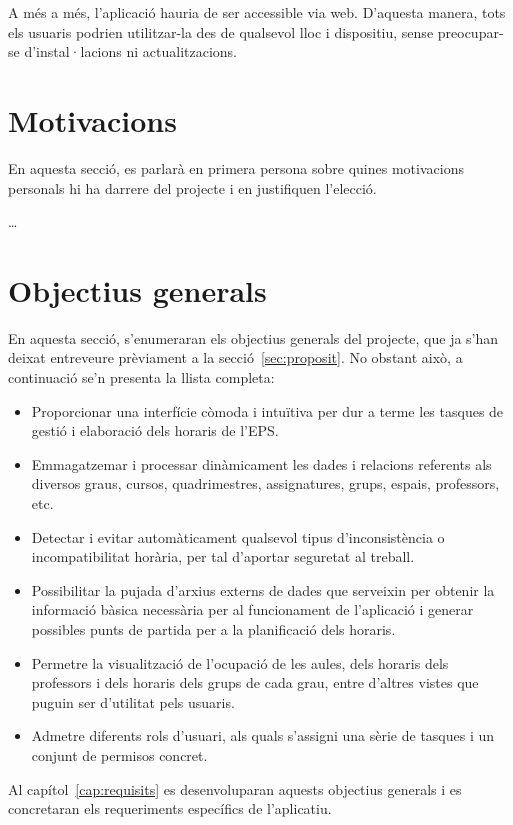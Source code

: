 \documentclass[a4paper,12pt]{ThesisStyle}
\begin{document}
A més a més, l'aplicació hauria de ser accessible via web. D'aquesta manera, tots els usuaris podrien utilitzar-la des de qualsevol lloc i dispositiu, sense
preocupar-se d'instal·lacions ni actualitzacions.

\section{Motivacions}
\label{sec:motivacions}

En aquesta secció, es parlarà en primera persona sobre quines motivacions personals hi ha darrere del projecte i en justifiquen l'elecció.

\ldots

\section{Objectius generals}
\label{sec:objectius_generals}

En aquesta secció, s'enumeraran els objectius generals del projecte, que ja s'han deixat entreveure prèviament a la secció~\ref{sec:proposit}. No obstant això,
a continuació se'n presenta la llista completa:
\begin{itemize}
  \item Proporcionar una interfície còmoda i intuïtiva per dur a terme les tasques de gestió i elaboració dels horaris de l'EPS.
  \item Emmagatzemar i processar dinàmicament les dades i relacions referents als diversos graus, cursos, quadrimestres, assignatures, grups, espais, professors, etc.
  \item Detectar i evitar automàticament qualsevol tipus d'inconsistència o incompatibilitat horària, per tal d'aportar seguretat al treball.
  \item Possibilitar la pujada d'arxius externs de dades que serveixin per obtenir la informació bàsica necessària per al funcionament de l'aplicació i generar possibles
  punts de partida per a la planificació dels horaris.
  \item Permetre la visualització de l'ocupació de les aules, dels horaris dels professors i dels horaris dels grups de cada grau, entre d'altres vistes que puguin ser
  d'utilitat pels usuaris.
  \item Admetre diferents rols d'usuari, als quals s'assigni una sèrie de tasques i un conjunt de permisos concret.
\end{itemize}

Al capítol~\ref{cap:requisits} es desenvoluparan aquests objectius generals i es concretaran els requeriments específics de l'aplicatiu.
\end{document}
